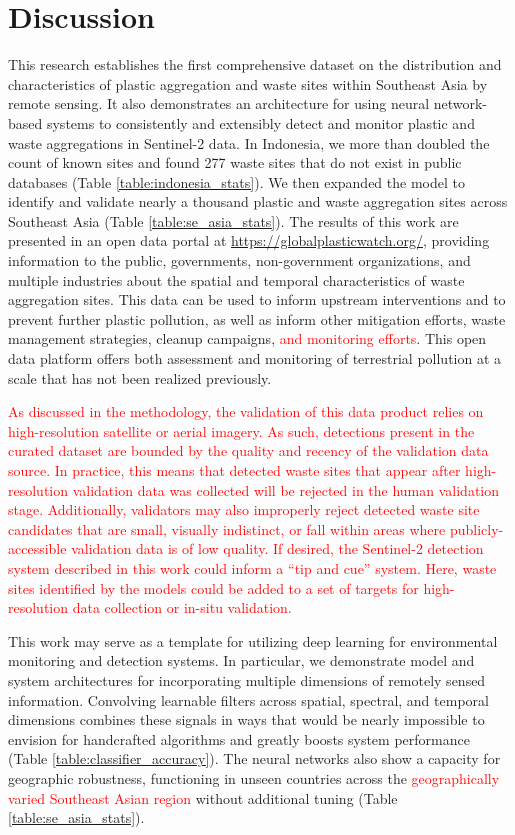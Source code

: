\documentclass[10pt,letterpaper]{article}
\begin{document}
\section*{Discussion}
This research establishes the first comprehensive dataset on the distribution and characteristics of plastic aggregation and waste sites within Southeast Asia by remote sensing. It also demonstrates an architecture for using neural network-based systems to consistently and extensibly detect and monitor plastic and waste aggregations in Sentinel-2 data. In Indonesia, we more than doubled the count of known sites and found 277 waste sites that do not exist in public databases (Table \ref{table:indonesia_stats}). We then expanded the model to identify and validate nearly a thousand plastic and waste aggregation sites across Southeast Asia (Table \ref{table:se_asia_stats}). The results of this work are presented in an open data portal at \url{https://globalplasticwatch.org/}, providing information to the public, governments, non-government organizations, and multiple industries about the spatial and temporal characteristics of waste aggregation sites. This data can be used to inform upstream interventions and to prevent further plastic pollution, as well as inform other mitigation efforts, waste management strategies, cleanup campaigns, \textcolor{red}{and monitoring efforts}. This open data platform offers both assessment and monitoring of terrestrial pollution at a scale that has not been realized previously.

\textcolor{red}{As discussed in the methodology, the validation of this data product relies on high-resolution satellite or aerial imagery. As such, detections present in the curated dataset are bounded by the quality and recency of the validation data source. In practice, this means that detected waste sites that appear after high-resolution validation data was collected will be rejected in the human validation stage. Additionally, validators may also improperly reject detected waste site candidates that are small, visually indistinct, or fall within areas where publicly-accessible validation data is of low quality. If desired, the Sentinel-2 detection system described in this work could inform a “tip and cue” system. Here, waste sites identified by the models could be added to a set of targets for high-resolution data collection or in-situ validation.}

This work may serve as a template for utilizing deep learning for environmental monitoring and detection systems. In particular, we demonstrate model and system architectures for incorporating multiple dimensions of remotely sensed information. Convolving learnable filters across spatial, spectral, and temporal dimensions combines these signals in ways that would be nearly impossible to envision for handcrafted algorithms and greatly boosts system performance (Table \ref{table:classifier_accuracy}). The neural networks also show a capacity for geographic robustness, functioning in unseen countries across the \textcolor{red}{geographically varied Southeast Asian region} without additional tuning (Table \ref{table:se_asia_stats}).
\end{document}
